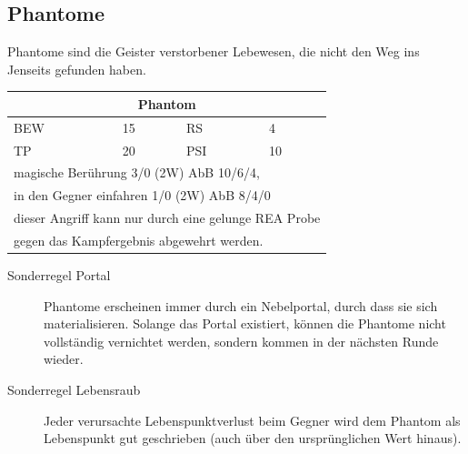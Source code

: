 \subsection{Phantome}
\par Phantome sind die Geister verstorbener Lebewesen, die nicht den Weg ins Jenseits gefunden haben.\\
\par \begin{tabular}{p{2cm}p{2cm}p{2cm}p{2cm}}
\hline
\hline
\multicolumn{4}{c}{\textbf{Phantom}}\\
\hline
\hline
BEW & 15 & RS  &  4\\
TP  & 20 & PSI & 10\\
\hline
\multicolumn{4}{l}{magische Berührung 3/0 (2W) AbB 10/6/4,}\\
\multicolumn{4}{l}{in den Gegner einfahren 1/0 (2W) AbB 8/4/0}\\
\multicolumn{4}{l}{dieser Angriff kann nur durch eine gelunge REA Probe}\\
\multicolumn{4}{l}{gegen das Kampfergebnis abgewehrt werden.}\\
\hline
\end{tabular}
\begin{description}
\item[Sonderregel Portal] Phantome erscheinen immer durch ein Nebelportal, durch dass sie sich materialisieren.
Solange das Portal existiert, können die Phantome nicht vollständig vernichtet werden, sondern kommen in der nächsten
Runde wieder.
\item[Sonderregel Lebensraub] Jeder verursachte Lebenspunktverlust beim Gegner wird dem Phantom als Lebenspunkt gut
geschrieben (auch über den ursprünglichen Wert hinaus).
\end{description}